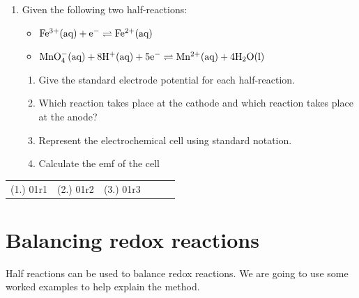 {\begin{enumerate}
\item Given the following two half-reactions:

	\begin{itemize}
	\item{$\rm{Fe^{3+}(aq) + e^{-} \rightleftharpoons Fe^{2+}(aq)}$}
	\item{$\rm{MnO_{4}^{-}(aq) + 8H^{+}(aq) + 5e^{-} \rightleftharpoons Mn^{2+}(aq) + 4H_{2}O(l)}$}
	\end{itemize}

	\begin{enumerate}
	\item{Give the standard electrode potential for each half-reaction.}
	\item{Which reaction takes place at the cathode and which reaction takes place at the anode?}
	\item{Represent the electrochemical cell using standard notation.}
	\item{Calculate the emf of the cell}
	\end{enumerate}

\end{enumerate}

\par \practiceinfo
\par \begin{tabular}[h]{cccccc}
(1.)	01r1	&
(2.)	01r2	&
(3.)	01r3	&
\end{tabular}

}






\section{Balancing redox reactions}
\label{sec:electrochemical:balancing}

Half reactions can be used to balance redox reactions. We are going to use some worked examples to help explain the method.


